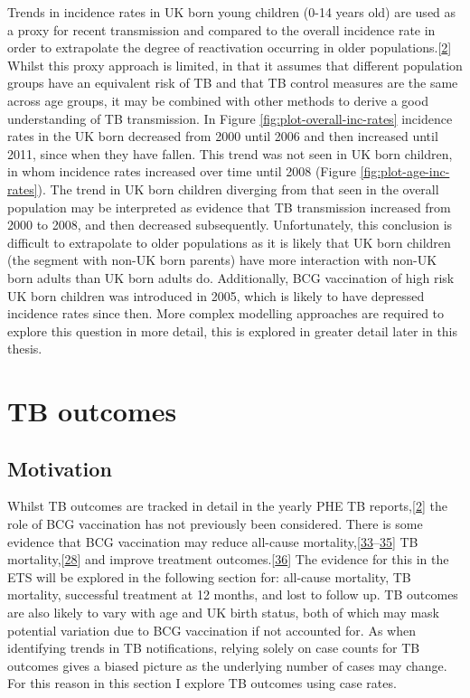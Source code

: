 \documentclass[11pt,twoside]{bristolthesis}
\begin{document}
  Trends in incidence rates in UK born young children (0-14 years old) are used as a proxy for recent transmission and compared to the overall incidence rate in order to extrapolate the degree of reactivation occurring in older populations.{[}\protect\hyperlink{ref-PHE2017}{2}{]} Whilst this proxy approach is limited, in that it assumes that different population groups have an equivalent risk of TB and that TB control measures are the same across age groups, it may be combined with other methods to derive a good understanding of TB transmission. In Figure \ref{fig:plot-overall-inc-rates} incidence rates in the UK born decreased from 2000 until 2006 and then increased until 2011, since when they have fallen. This trend was not seen in UK born children, in whom incidence rates increased over time until 2008 (Figure \ref{fig:plot-age-inc-rates}). The trend in UK born children diverging from that seen in the overall population may be interpreted as evidence that TB transmission increased from 2000 to 2008, and then decreased subsequently. Unfortunately, this conclusion is difficult to extrapolate to older populations as it is likely that UK born children (the segment with non-UK born parents) have more interaction with non-UK born adults than UK born adults do. Additionally, BCG vaccination of high risk UK born children was introduced in 2005, which is likely to have depressed incidence rates since then. More complex modelling approaches are required to explore this question in more detail, this is explored in greater detail later in this thesis.
  
  \hypertarget{tb-outcomes}{%
  \section{TB outcomes}\label{tb-outcomes}}
  
  \hypertarget{motivation-1}{%
  \subsection{Motivation}\label{motivation-1}}
  
  Whilst TB outcomes are tracked in detail in the yearly PHE TB reports,{[}\protect\hyperlink{ref-PHE2017}{2}{]} the role of BCG vaccination has not previously been considered. There is some evidence that BCG vaccination may reduce all-cause mortality,{[}\protect\hyperlink{ref-Garly2003}{33}--\protect\hyperlink{ref-Rieckmann2016}{35}{]} TB mortality,{[}\protect\hyperlink{ref-Abubakar2013}{28}{]} and improve treatment outcomes.{[}\protect\hyperlink{ref-Jeremiah2010}{36}{]} The evidence for this in the ETS will be explored in the following section for: all-cause mortality, TB mortality, successful treatment at 12 months, and lost to follow up. TB outcomes are also likely to vary with age and UK birth status, both of which may mask potential variation due to BCG vaccination if not accounted for. As when identifying trends in TB notifications, relying solely on case counts for TB outcomes gives a biased picture as the underlying number of cases may change. For this reason in this section I explore TB outcomes using case rates.
  
\end{document}
